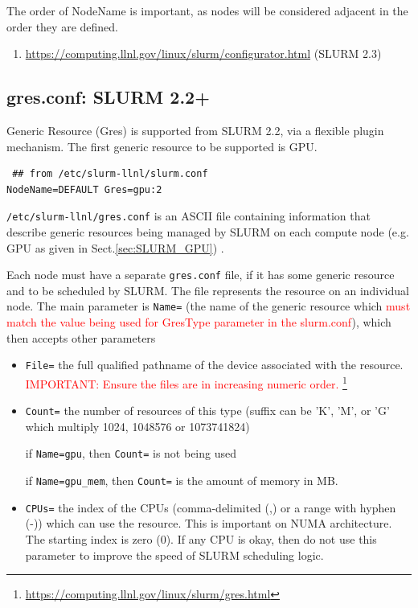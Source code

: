 The order of NodeName is important, as nodes will be considered adjacent in the
order they are defined.


\begin{enumerate}
  \item \url{https://computing.llnl.gov/linux/slurm/configurator.html} (SLURM
  2.3)
\end{enumerate}


\subsection{gres.conf: SLURM 2.2+}
\label{sec:gres.conf}

Generic Resource (Gres) is supported from SLURM 2.2, via a flexible plugin
mechanism. The first generic resource to be supported is GPU.
\begin{verbatim}
 ## from /etc/slurm-llnl/slurm.conf
NodeName=DEFAULT Gres=gpu:2
\end{verbatim}

\verb!/etc/slurm-llnl/gres.conf! is an ASCII file containing
information that describe generic resources being managed by SLURM on each compute
node (e.g. GPU as given in Sect.\ref{sec:SLURM_GPU}) .

Each node must have a separate \verb!gres.conf! file, if it has some generic
resource and to be scheduled by SLURM. The file represents the resource on an
individual node. The main parameter is \verb!Name=! (the name of the generic
resource which \textcolor{red}{must match the value being used for GresType
parameter in the slurm.conf}), which then accepts other parameters
\begin{itemize}
  \item \verb!File=! the full qualified pathname of the device associated with
  the resource. \textcolor{red}{IMPORTANT: Ensure the files are in increasing
  numeric order.}
  \footnote{\url{https://computing.llnl.gov/linux/slurm/gres.html}}
  
  \item \verb!Count=! the number of resources of this type (suffix can be 'K',
  'M', or 'G' which multiply 1024, 1048576 or 1073741824)

if \verb!Name=gpu!, then \verb!Count=! is not being used

if \verb!Name=gpu_mem!, then \verb!Count=! is the amount of memory in MB.

  \item \verb!CPUs=! the index of the CPUs (comma-delimited (,) or a range with
  hyphen (-)) which can use the resource. This is important on NUMA
  architecture. The starting index is zero (0). If any CPU is okay, then do not
  use this parameter to improve the speed of SLURM scheduling logic.
\end{itemize}

